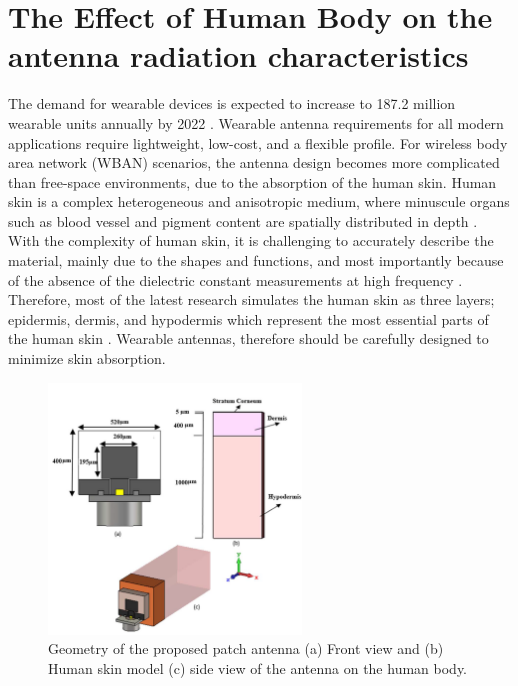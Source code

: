 \documentclass[12pt]{suhbook}
\begin{document}
\section{The Effect of Human Body on the antenna radiation characteristics}
% 
% 
The demand for wearable devices is expected to increase to \num{187.2}  million wearable units annually by \num{2022} \cite{hernandez2019wearable}. Wearable antenna requirements for all modern applications require lightweight, low-cost, and a flexible profile. For wireless body area network (WBAN) scenarios, the antenna design becomes more complicated than free-space environments, due to the absorption of the human skin. Human skin is a complex heterogeneous and anisotropic medium, where minuscule organs such as blood vessel and pigment content are spatially distributed in depth \cite{flynn2011modeling}. With the complexity of human skin, it is challenging to accurately describe the material, mainly due to the shapes and functions, and most importantly because of the absence of the dielectric constant measurements at high frequency \cite{alekseev2007human}. Therefore, most of the latest research simulates the human skin as three layers; epidermis, dermis, and hypodermis which represent the most essential parts of the human skin \cite{lynch1989growth}. Wearable antennas, therefore should be carefully designed to minimize skin absorption.
% 
\begin{figure}[hbt!]
\centering
\includegraphics[width=0.6\textwidth]{8}
\caption{Geometry of the proposed patch antenna (a) Front view and (b) Human skin model (c) side view of the antenna on the human body.}
\label{Fig 8}
\end{figure}
% 
\end{document}
